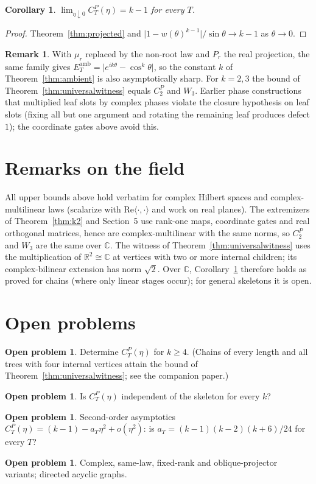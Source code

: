 \documentclass[11pt]{amsart}
\newtheorem{corollary}[theorem]{Corollary}
\theoremstyle{definition}
\newtheorem{remark}[theorem]{Remark}
\newtheorem{problem}[theorem]{Open problem}
\newcommand{\R}{\mathbb{R}}
\newcommand{\C}{\mathbb{C}}
\newcommand{\amb}{\mathrm{amb}}
\newcommand{\ip}[2]{\langle #1,#2\rangle}
\begin{document}
\begin{corollary}\label{cor:limit}
$\lim_{\eta\downarrow0}C^P_T(\eta)=k-1$ for every $T$.
\end{corollary}
\begin{proof}
Theorem~\ref{thm:projected} and $\lvert1-w(\theta)^{k-1}\rvert/\sin\theta\to k-1$ as $\theta\to0$.
\end{proof}

\begin{remark}
With $\mu_r$ replaced by the non-root law and $P_r$ the real projection, the same family gives
$E^\amb_T=\lvert e^{ik\theta}-\cos^k\theta\rvert$, so the constant $k$ of
Theorem~\ref{thm:ambient} is also asymptotically sharp. For $k=2,3$ the bound of
Theorem~\ref{thm:universalwitness} equals $C_2^P$ and $W_3$. Earlier phase constructions that
multiplied leaf slots by complex phases violate the closure hypothesis on leaf slots (fixing all
but one argument and rotating the remaining leaf produces defect $1$); the coordinate gates above
avoid this.
\end{remark}

\section{Remarks on the field}

All upper bounds above hold verbatim for complex Hilbert spaces and complex-multilinear laws
(scalarize with $\mathrm{Re}\ip\cdot\cdot$ and work on real planes). The extremizers of
Theorem~\ref{thm:k2} and Section~5 use rank-one maps, coordinate gates and real orthogonal
matrices, hence are complex-multilinear with the same norms, so $C_2^P$ and $W_3$ are the same over
$\C$. The witness of Theorem~\ref{thm:universalwitness} uses the multiplication of $\R^2\cong\C$ at
vertices with two or more internal children; its complex-bilinear extension has norm $\sqrt2$.
Over $\C$, Corollary~\ref{cor:limit} therefore holds as proved for chains (where only linear stages
occur); for general skeletons it is open.

\section{Open problems}

\begin{problem} Determine $C^P_T(\eta)$ for $k\ge4$. (Chains of every length and all trees with
four internal vertices attain the bound of Theorem~\ref{thm:universalwitness}; see the companion
paper.)\end{problem}
\begin{problem} Is $C^P_T(\eta)$ independent of the skeleton for every $k$?\end{problem}
\begin{problem} Second-order asymptotics $C^P_T(\eta)=(k-1)-a_T\eta^2+o(\eta^2)$: is
$a_T=(k-1)(k-2)(k+6)/24$ for every $T$?\end{problem}
\begin{problem} Complex, same-law, fixed-rank and oblique-projector variants; directed acyclic
graphs.\end{problem}
\end{document}
